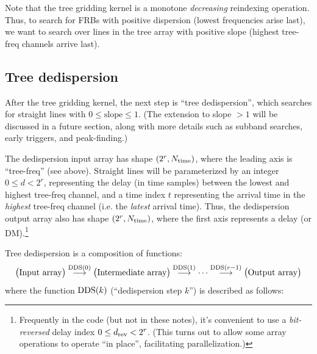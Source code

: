 \documentclass{article}
\numberwithin{equation}{section}   %
\def\DDS{{\rm DDS}}
\begin{document}
Note that the tree gridding kernel is a monotone {\em decreasing} reindexing operation.
Thus, to search for FRBs with positive dispersion (lowest frequencies arise last), we want to search over lines in the tree array with positive slope (highest tree-freq channels arrive last).

\subsection{Tree dedispersion}
\label{sec:tree_dedispersion}

After the tree gridding kernel, the next step is ``tree dedispersion'', which searches for straight lines with $0\le \mbox{slope} \le 1$.
(The extension to slope $>1$ will be discussed in a future section, along with more details such as subband searches, early triggers, and peak-finding.)

The dedispersion input array has shape $(2^r, N_{\rm time})$, where the leading axis is ``tree-freq'' (see above).
Straight lines will be parameterized by an integer $0 \le d < 2^r$, representing
the delay (in time samples) between the lowest and highest tree-freq channel,
and a time index $t$ representing the arrival time in the {\em highest} tree-freq channel
(i.e. the {\em latest} arrival time).
Thus, the dedispersion output array also has shape $(2^r, N_{\rm time})$, where the first axis represents a delay (or DM).\footnote{Frequently in the code (but not in these notes), it's convenient to use a {\em bit-reversed} delay index $0 \le d_{\rm rev} < 2^r$. (This turns out to allow some array operations to operate ``in place'', facilitating parallelization.)}

Tree dedispersion is a composition of functions:
\begin{equation}
\big( \mbox{Input array} \big)
  \overset{\DDS(0)}{\longrightarrow} \big( \mbox{Intermediate array} \big)
  \overset{\DDS(1)}{\longrightarrow} \cdots 
  \overset{\DDS(r-1)}{\longrightarrow}
\big( \mbox{Output array} \big)
\label{eq:DD_composition}
\end{equation}
where the function $\DDS(k)$ (``dedispersion step $k$'') is described as follows:
\end{document}
